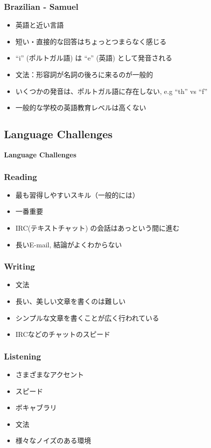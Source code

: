 \documentclass[aspectratio=169,11pt,hyperref={colorlinks=true}]{beamer}
\begin{document}
\begin{frame}
\frametitle{Brazilian - Samuel}
  \begin{itemize}
  \item 英語と近い言語
  \item 短い・直接的な回答はちょっとつまらなく感じる
  \item ``i'' (ポルトガル語) は ``e'' (英語) として発音される
  \item 文法：形容詞が名詞の後ろに来るのが一般的
  \item いくつかの発音は、ポルトガル語に存在しない, e.g ``th'' vs ``f''
  \item 一般的な学校の英語教育レベルは高くない
  \end{itemize}
\end{frame}


\subsection{Language Challenges}
\begin{frame}
  \bf\Huge{Language Challenges}
\end{frame}

\begin{frame}
\frametitle{Reading}
  \begin{itemize}
  \item 最も習得しやすいスキル（一般的には）
  \item 一番重要
  \item IRC(テキストチャット) の会話はあっという間に進む
  \item 長いE-mail, 結論がよくわからない
  \end{itemize}
\end{frame}

\begin{frame}
\frametitle{Writing}
  \begin{itemize}
  \item 文法
  \item 長い、美しい文章を書くのは難しい
  \item シンプルな文章を書くことが広く行われている
  \item IRCなどのチャットのスピード
  \end{itemize}
\end{frame}

\begin{frame}
\frametitle{Listening}
  \begin{itemize}
  \item さまざまなアクセント
  \item スピード
  \item ボキャブラリ
  \item 文法
  \item 様々なノイズのある環境
  \end{itemize}
\end{frame}
\end{document}
